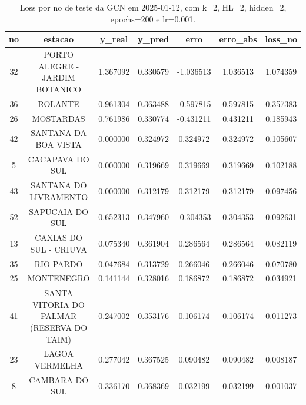 \begin{table}[h]
\centering
\caption{Loss por no de teste da GCN em 2025-01-12, com k=2, HL=2, hidden=2, epochs=200 e lr=0.001.}
\label{tab:gcn_loss_k2_hl2_h2_e200_d20250112}
\begin{tabular}{ccccccc}
\toprule
no & estacao & y\_real & y\_pred & erro & erro\_abs & loss\_no \\
\midrule
32 & PORTO ALEGRE - JARDIM BOTANICO & 1.367092 & 0.330579 & -1.036513 & 1.036513 & 1.074359 \\
36 & ROLANTE & 0.961304 & 0.363488 & -0.597815 & 0.597815 & 0.357383 \\
26 & MOSTARDAS & 0.761986 & 0.330774 & -0.431211 & 0.431211 & 0.185943 \\
42 & SANTANA DA BOA VISTA & 0.000000 & 0.324972 & 0.324972 & 0.324972 & 0.105607 \\
5 & CACAPAVA DO SUL & 0.000000 & 0.319669 & 0.319669 & 0.319669 & 0.102188 \\
43 & SANTANA DO LIVRAMENTO & 0.000000 & 0.312179 & 0.312179 & 0.312179 & 0.097456 \\
52 & SAPUCAIA DO SUL & 0.652313 & 0.347960 & -0.304353 & 0.304353 & 0.092631 \\
13 & CAXIAS DO SUL - CRIUVA & 0.075340 & 0.361904 & 0.286564 & 0.286564 & 0.082119 \\
35 & RIO PARDO & 0.047684 & 0.313729 & 0.266046 & 0.266046 & 0.070780 \\
25 & MONTENEGRO & 0.141144 & 0.328016 & 0.186872 & 0.186872 & 0.034921 \\
41 & SANTA VITORIA DO PALMAR (RESERVA DO TAIM) & 0.247002 & 0.353176 & 0.106174 & 0.106174 & 0.011273 \\
23 & LAGOA VERMELHA & 0.277042 & 0.367525 & 0.090482 & 0.090482 & 0.008187 \\
8 & CAMBARA DO SUL & 0.336170 & 0.368369 & 0.032199 & 0.032199 & 0.001037 \\
\bottomrule
\end{tabular}
\end{table}
